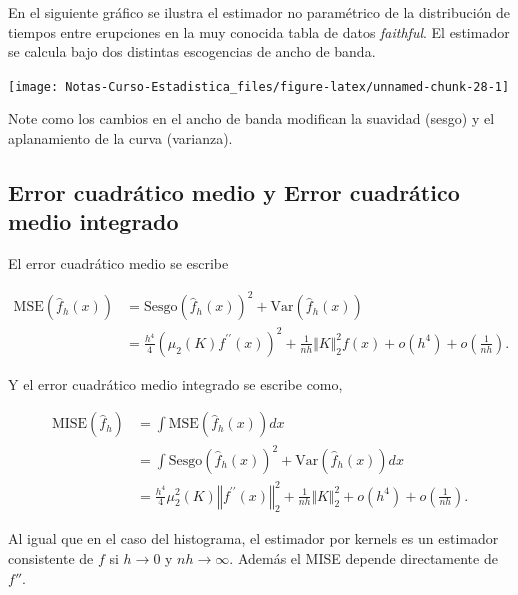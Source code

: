 \documentclass[
  12pt,
]{book}
\begin{document}
En el siguiente gráfico se ilustra el estimador no paramétrico de la
distribución de tiempos entre erupciones en la muy conocida tabla de
datos \emph{faithful}. El estimador se calcula bajo dos distintas
escogencias de ancho de banda.

\begin{center}\texttt{[image: Notas-Curso-Estadistica\_files/figure-latex/unnamed-chunk-28-1]} \end{center}

Note como los cambios en el ancho de banda modifican la suavidad (sesgo)
y el aplanamiento de la curva (varianza).

\hypertarget{error-cuadruxe1tico-medio-y-error-cuadruxe1tico-medio-integrado}{%
\subsection{Error cuadrático medio y Error cuadrático medio
integrado}\label{error-cuadruxe1tico-medio-y-error-cuadruxe1tico-medio-integrado}}

El error cuadrático medio se escribe

\begin{align*}
\mathrm{MSE}(\hat{f}_{h}(x))
& = \mathrm{Sesgo}\left(\hat{f}_{h}(x)\right)^{2} + \mathrm{Var}\left(\hat{f}_{h}(x)\right)                                                 \\
& = \frac{h^{4}}{4}\left(\mu_{2}(K)f^{\prime\prime}(x)\right)^{2}+\frac{1}{nh}\Vert K\Vert_{2}^{2}f(x)+o(h^{4})+o\left(\frac{1}{nh}\right).
\end{align*}

Y el error cuadrático medio integrado se escribe como,

\begin{align*}
\mathrm{MISE}\left(\hat{f}_{h}\right) & = \int \mathrm{MSE}\left(\hat{f}_{h}(x)\right)dx                                                                                                        \\
& = \int \mathrm{Sesgo}\left(\hat{f}_{h}(x)\right)^{2} + \mathrm{Var}\left(\hat{f}_{h}(x)\right)dx                                                        \\
& = \frac{h^{4}}{4}\mu_{2}^{2}(K)\left\Vert f^{\prime\prime}(x)\right\Vert_{2}^{2} +\frac{1}{nh}\Vert K\Vert_{2}^{2}+o(h^{4})+o\left(\frac{1}{nh}\right).
\end{align*}

Al igual que en el caso del histograma, el estimador por kernels es un
estimador consistente de \(f\) si \(h\rightarrow 0\) y
\(nh\rightarrow \infty\). Además el MISE depende directamente de
\(f''\).
\end{document}
